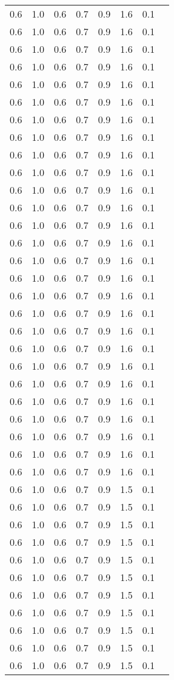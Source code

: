 \begin{tabular}{L{1in}|L{1in}|L{1in}|L{1in}|L{1in}|L{1in}|L{1in}|L{1in}}
0.6&1.0&0.6&0.7&0.9&1.6&0.1\\
0.6&1.0&0.6&0.7&0.9&1.6&0.1\\
0.6&1.0&0.6&0.7&0.9&1.6&0.1\\
0.6&1.0&0.6&0.7&0.9&1.6&0.1\\
0.6&1.0&0.6&0.7&0.9&1.6&0.1\\
0.6&1.0&0.6&0.7&0.9&1.6&0.1\\
0.6&1.0&0.6&0.7&0.9&1.6&0.1\\
0.6&1.0&0.6&0.7&0.9&1.6&0.1\\
0.6&1.0&0.6&0.7&0.9&1.6&0.1\\
0.6&1.0&0.6&0.7&0.9&1.6&0.1\\
0.6&1.0&0.6&0.7&0.9&1.6&0.1\\
0.6&1.0&0.6&0.7&0.9&1.6&0.1\\
0.6&1.0&0.6&0.7&0.9&1.6&0.1\\
0.6&1.0&0.6&0.7&0.9&1.6&0.1\\
0.6&1.0&0.6&0.7&0.9&1.6&0.1\\
0.6&1.0&0.6&0.7&0.9&1.6&0.1\\
0.6&1.0&0.6&0.7&0.9&1.6&0.1\\
0.6&1.0&0.6&0.7&0.9&1.6&0.1\\
0.6&1.0&0.6&0.7&0.9&1.6&0.1\\
0.6&1.0&0.6&0.7&0.9&1.6&0.1\\
0.6&1.0&0.6&0.7&0.9&1.6&0.1\\
0.6&1.0&0.6&0.7&0.9&1.6&0.1\\
0.6&1.0&0.6&0.7&0.9&1.6&0.1\\
0.6&1.0&0.6&0.7&0.9&1.6&0.1\\
0.6&1.0&0.6&0.7&0.9&1.6&0.1\\
0.6&1.0&0.6&0.7&0.9&1.6&0.1\\
0.6&1.0&0.6&0.7&0.9&1.6&0.1\\
0.6&1.0&0.6&0.7&0.9&1.5&0.1\\
0.6&1.0&0.6&0.7&0.9&1.5&0.1\\
0.6&1.0&0.6&0.7&0.9&1.5&0.1\\
0.6&1.0&0.6&0.7&0.9&1.5&0.1\\
0.6&1.0&0.6&0.7&0.9&1.5&0.1\\
0.6&1.0&0.6&0.7&0.9&1.5&0.1\\
0.6&1.0&0.6&0.7&0.9&1.5&0.1\\
0.6&1.0&0.6&0.7&0.9&1.5&0.1\\
0.6&1.0&0.6&0.7&0.9&1.5&0.1\\
0.6&1.0&0.6&0.7&0.9&1.5&0.1\\
0.6&1.0&0.6&0.7&0.9&1.5&0.1\\

\end{tabular}
